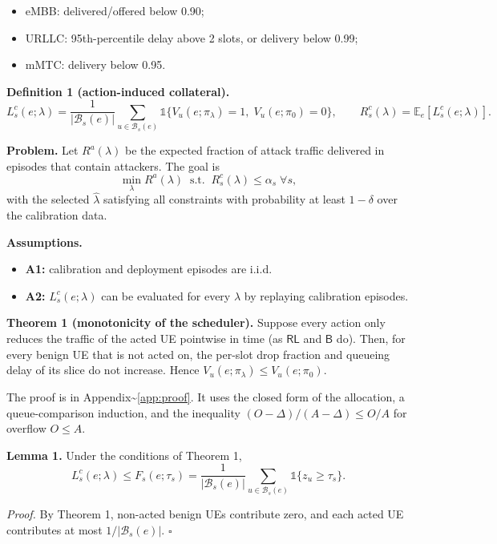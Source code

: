 \begin{itemize}
\tightlist
\item
  eMBB: delivered/offered below 0.90;
\item
  URLLC: 95th-percentile delay above 2 slots, or delivery below 0.99;
\item
  mMTC: delivery below 0.95.
\end{itemize}

\textbf{Definition 1 (action-induced collateral).}
\[L^{c}_s(e;\lambda)=\frac{1}{|\mathcal{B}_s(e)|}\sum_{u\in\mathcal{B}_s(e)}\mathbb{1}\{V_u(e;\pi_\lambda)=1,\;V_u(e;\pi_0)=0\},\qquad R^c_s(\lambda)=\mathbb{E}_e[L^c_s(e;\lambda)].\]

\textbf{Problem.} Let \(R^a(\lambda)\) be the expected fraction of
attack traffic delivered in episodes that contain attackers. The goal is
\[\min_{\lambda}R^a(\lambda)\;\;\text{s.t.}\;\;R^c_s(\lambda)\le\alpha_s\;\forall s,\]
with the selected \(\hat{\lambda}\) satisfying all constraints with
probability at least \(1-\delta\) over the calibration data.

\textbf{Assumptions.}

\begin{itemize}
\tightlist
\item
  \textbf{A1:} calibration and deployment episodes are i.i.d.
\item
  \textbf{A2:} \(L^c_s(e;\lambda)\) can be evaluated for every
  \(\lambda\) by replaying calibration episodes.
\end{itemize}

\textbf{Theorem 1 (monotonicity of the scheduler).} Suppose every action
only reduces the traffic of the acted UE pointwise in time (as
\(\mathsf{RL}\) and \(\mathsf{B}\) do). Then, for every benign UE that
is not acted on, the per-slot drop fraction and queueing delay of its
slice do not increase. Hence \(V_u(e;\pi_\lambda)\le V_u(e;\pi_0)\).

The proof is in Appendix\textasciitilde{}\ref{app:proof}. It uses the
closed form of the allocation, a queue-comparison induction, and the
inequality \((O-\Delta)/(A-\Delta)\le O/A\) for overflow \(O\le A\).

\textbf{Lemma 1.} Under the conditions of Theorem 1,
\[L^c_s(e;\lambda)\le F_s(e;\tau_s)=\frac{1}{|\mathcal{B}_s(e)|}\sum_{u\in\mathcal{B}_s(e)}\mathbb{1}\{z_u\ge\tau_s\}.\]

\emph{Proof.} By Theorem 1, non-acted benign UEs contribute zero, and
each acted UE contributes at most \(1/|\mathcal{B}_s(e)|\). $\square$

